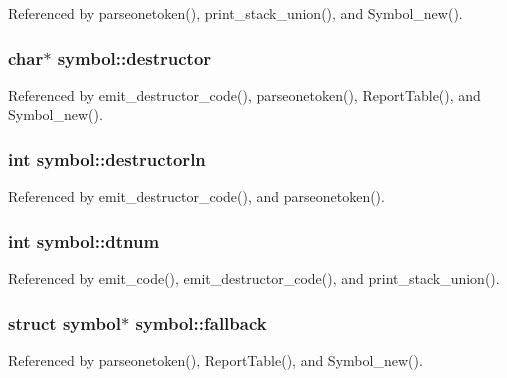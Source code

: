 Referenced by parseonetoken(), print\-\_\-stack\-\_\-union(), and Symbol\-\_\-new().

\hypertarget{structsymbol_ae2b28522ba863dcbf3669b507721f09a}{
\subsubsection[{destructor}]{\setlength{\rightskip}{0pt plus 5cm}char$\ast$ symbol\-::destructor}}\label{structsymbol_ae2b28522ba863dcbf3669b507721f09a}


Referenced by emit\-\_\-destructor\-\_\-code(), parseonetoken(), Report\-Table(), and Symbol\-\_\-new().

\hypertarget{structsymbol_a1bff7c9f99ddfaf424749f0d4d81de55}{
\subsubsection[{destructorln}]{\setlength{\rightskip}{0pt plus 5cm}int symbol\-::destructorln}}\label{structsymbol_a1bff7c9f99ddfaf424749f0d4d81de55}


Referenced by emit\-\_\-destructor\-\_\-code(), and parseonetoken().

\hypertarget{structsymbol_ae976c29bbbd980685a026b6e658c4dc3}{
\subsubsection[{dtnum}]{\setlength{\rightskip}{0pt plus 5cm}int symbol\-::dtnum}}\label{structsymbol_ae976c29bbbd980685a026b6e658c4dc3}


Referenced by emit\-\_\-code(), emit\-\_\-destructor\-\_\-code(), and print\-\_\-stack\-\_\-union().

\hypertarget{structsymbol_a0a658f976944ccfbed28466b4eec903b}{
\subsubsection[{fallback}]{\setlength{\rightskip}{0pt plus 5cm}struct {\bf symbol}$\ast$ symbol\-::fallback}}\label{structsymbol_a0a658f976944ccfbed28466b4eec903b}


Referenced by parseonetoken(), Report\-Table(), and Symbol\-\_\-new().

